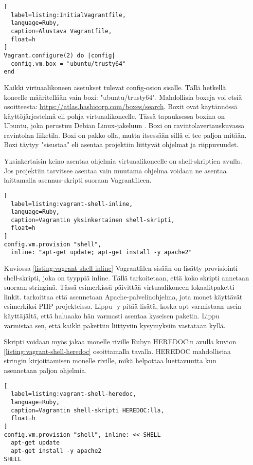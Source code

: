 \begin{lstlisting}[
  label=listing:InitialVagrantfile,
  language=Ruby,
  caption=Alustava Vagrantfile,
  float=h
]
Vagrant.configure(2) do |config|
  config.vm.box = "ubuntu/trusty64"
end
\end{lstlisting}

Kaikki virtuaalikoneen asetukset tulevat config-osion sisälle. Tällä hetkellä koneelle määritellään vain boxi: "ubuntu/trusty64". Mahdollisia boxeja voi etsiä osoitteesta: \url{https://atlas.hashicorp.com/boxes/search}. Boxit ovat käytännössä käyttöjärjestelmä eli pohja virtuaalikoneelle. Tässä tapauksessa boxina on Ubuntu, joka perustuu Debian Linux-jakeluun \cite{link:ubuntu}. Boxi on ravintolavertauskuvassa ravintolan liiketila. Boxi on pakko olla, mutta itsessään sillä ei tee paljon mitään. Boxi täytyy "sisustaa" eli asentaa projektiin liittyvät ohjelmat ja riippuvuudet.

Yksinkertaisin keino asentaa ohjelmia virtuaalikoneelle on shell-skriptien avulla. Jos projektiin tarvitsee asentaa vain muutama ohjelma voidaan ne asentaa laittamalla asennus-skripti suoraan Vagrantfileen. 

\begin{lstlisting}[
  label=listing:vagrant-shell-inline,
  language=Ruby,
  caption=Vagrantin yksinkertainen shell-skripti,
  float=h
]
config.vm.provision "shell",
  inline: "apt-get update; apt-get install -y apache2"
\end{lstlisting}

Kuviossa \ref{listing:vagrant-shell-inline} Vagrantfilen sisään on lisätty provisiointi shell-skripti, joka on tyyppiä inline. Tällä tarkoitetaan, että koko skripti annetaan suoraan stringinä. Tässä esimerkissä  päivittää virtuaalikoneen lokaalitpaketti linkit.  tarkoittaa että asennetaan Apache-palvelinohjelma, jota monet käyttävät esimerkiksi PHP-projekteissa. Lippu -y pitää lisätä, koska apt varmistaan usein käyttäjältä, että haluaako hän varmasti asentaa kyseisen paketin. Lippu varmistaa sen, että kaikki pakettiin liittyviin kysymyksiin vastataan kyllä.

Skripti voidaan myös jakaa monelle riville Rubyn HEREDOC:n avulla kuvion \ref{listing:vagrant-shell-heredoc} osoittamalla tavalla. HEREDOC \cite{link:ruby-heredoc} mahdollistaa stringin kirjoittamisen monelle riville, mikä helpottaa luettavuutta kun asennetaan paljon ohjelmia.

\begin{lstlisting}[
  label=listing:vagrant-shell-heredoc,
  language=Ruby,
  caption=Vagrantin shell-skripti HEREDOC:lla,
  float=h
]
config.vm.provision "shell", inline: <<-SHELL
  apt-get update
  apt-get install -y apache2
SHELL
\end{lstlisting}


